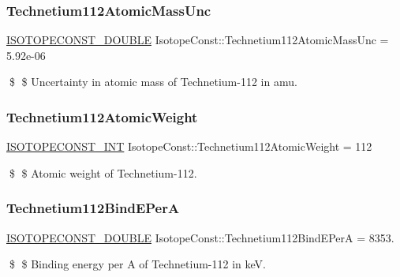 \subsubsection{\texorpdfstring{Technetium112\+Atomic\+Mass\+Unc}{Technetium112AtomicMassUnc}}
{\footnotesize\ttfamily \mbox{\hyperlink{group___isotope_const-_macros_ga8f45a7272ce02c0b4c65c44636ed719a}{I\+S\+O\+T\+O\+P\+E\+C\+O\+N\+S\+T\+\_\+\+D\+O\+U\+B\+LE}} Isotope\+Const\+::\+Technetium112\+Atomic\+Mass\+Unc = 5.\+92e-\/06}

\$ \$ Uncertainty in atomic mass of Technetium-\/112 in amu. \mbox{\label{group___isotope_const-_technetium-_tc112_gacd6949359238b5673f6b28aa5cad2e5b}} 
\subsubsection{\texorpdfstring{Technetium112\+Atomic\+Weight}{Technetium112AtomicWeight}}
{\footnotesize\ttfamily \mbox{\hyperlink{group___isotope_const-_macros_ga5f18360b3e99483a35c32d789e62621c}{I\+S\+O\+T\+O\+P\+E\+C\+O\+N\+S\+T\+\_\+\+I\+NT}} Isotope\+Const\+::\+Technetium112\+Atomic\+Weight = 112}

\$ \$ Atomic weight of Technetium-\/112. \mbox{\label{group___isotope_const-_technetium-_tc112_gad8fa1a80d528e38104970f06f9554ba0}} 
\subsubsection{\texorpdfstring{Technetium112\+Bind\+E\+PerA}{Technetium112BindEPerA}}
{\footnotesize\ttfamily \mbox{\hyperlink{group___isotope_const-_macros_ga8f45a7272ce02c0b4c65c44636ed719a}{I\+S\+O\+T\+O\+P\+E\+C\+O\+N\+S\+T\+\_\+\+D\+O\+U\+B\+LE}} Isotope\+Const\+::\+Technetium112\+Bind\+E\+PerA = 8353.}

\$ \$ Binding energy per A of Technetium-\/112 in keV. \mbox{\label{group___isotope_const-_technetium-_tc112_gaae1f9ddfd5c9f7152dd2dddd908ba29a}} 

